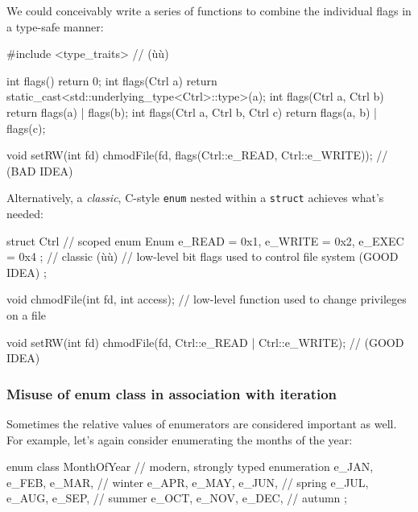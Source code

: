 \noindent We could conceivably write a series of functions to combine the
individual flags in a type-safe manner:

\begin{emcppslisting}[emcppsbatch=e14]
#include <type_traits>  // (ù{}ù)

int flags() { return 0; }
int flags(Ctrl a) { return static_cast<std::underlying_type<Ctrl>::type>(a); }
int flags(Ctrl a, Ctrl b) { return flags(a) | flags(b); }
int flags(Ctrl a, Ctrl b, Ctrl c) { return flags(a, b) | flags(c); }

void setRW(int fd)
{
    chmodFile(fd, flags(Ctrl::e_READ, Ctrl::e_WRITE));  // (BAD IDEA)
}
\end{emcppslisting}

\noindent Alternatively, a \emph{classic}, C-style \texttt{enum} nested within a
\texttt{struct} achieves what's needed:

\begin{emcppslisting}
struct Ctrl // scoped
{
    enum Enum { e_READ = 0x1, e_WRITE = 0x2, e_EXEC = 0x4 };  // classic (ù{}ù)
        // low-level bit flags used to control file system (GOOD IDEA)
};

void chmodFile(int fd, int access);
    // low-level function used to change privileges on a file

void setRW(int fd)
{
    chmodFile(fd, Ctrl::e_READ | Ctrl::e_WRITE);  // (GOOD IDEA)
}
\end{emcppslisting}


\subsubsection[Misuse of {\tt enum} {\tt class} in association with iteration]{Misuse of {\SubsubsecCode enum} {\SubsubsecCode class} in association with iteration}\label{misuse-of-enum-class-in-association-with-iteration}

Sometimes the relative values of enumerators are considered important as
well. For example, let's again consider enumerating the months of the
year:

\begin{emcppslisting}[emcppsbatch={e15,e16}]
enum class MonthOfYear  // modern, strongly typed enumeration
{
    e_JAN, e_FEB, e_MAR,  // winter
    e_APR, e_MAY, e_JUN,  // spring
    e_JUL, e_AUG, e_SEP,  // summer
    e_OCT, e_NOV, e_DEC,  // autumn
};
\end{emcppslisting}

